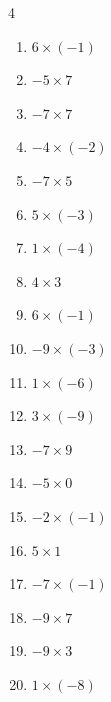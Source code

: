 \begin{multicols}{4}
\begin{enumerate}
\columnbreak %

\resetques

  \item $6\times (-1)$
        \phantom{$=-6$}

  \item $-5\times 7$
        \phantom{$=-35$}

  \item $-7\times 7$
        \phantom{$=-49$}

  \item $-4\times (-2)$
        \phantom{$=8$}

  \item $-7\times 5$
        \phantom{$=-35$}

  \item $5\times (-3)$
        \phantom{$=-15$}

  \item $1\times (-4)$
        \phantom{$=-4$}

  \item $4\times 3$
        \phantom{$=12$}

  \item $6\times (-1)$
        \phantom{$=-6$}

  \item $-9\times (-3)$
        \phantom{$=27$}

  \item $1\times (-6)$
        \phantom{$=-6$}

  \item $3\times (-9)$
        \phantom{$=-27$}

  \item $-7\times 9$
        \phantom{$=-63$}

  \item $-5\times 0$
        \phantom{$=0$}

  \item $-2\times (-1)$
        \phantom{$=2$}

  \item $5\times 1$
        \phantom{$=5$}

  \item $-7\times (-1)$
        \phantom{$=7$}

  \item $-9\times 7$
        \phantom{$=-63$}

  \item $-9\times 3$
        \phantom{$=-27$}

  \item $1\times (-8)$
        \phantom{$=-8$}


\end{enumerate}
\end{multicols}
